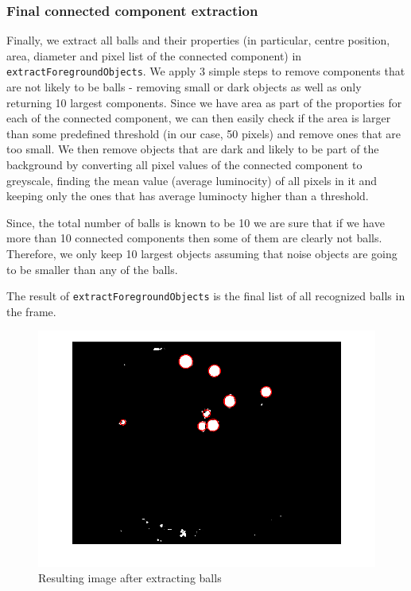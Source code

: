\documentclass[12pt,a4paper]{article}
\begin{document}
\subsubsection{Final connected component extraction}
Finally, we extract all balls and their properties (in particular, centre position, area, diameter and pixel list of the connected component) in \texttt{extractForegroundObjects}. We apply 3 simple steps to remove components that are not likely to be balls - removing small or dark objects as well as only returning 10 largest components. Since we have area as part of the proporties for each of the connected component, we can then easily check if the area is larger than some predefined threshold (in our case, 50 pixels) and remove ones that are too small. We then remove objects that are dark and likely to be part of the background by converting all pixel values of the connected component to greyscale, finding the mean value (average luminocity) of all pixels in it and keeping only the ones that has average luminocty higher than a threshold.

Since, the total number of balls is known to be 10 we are sure that if we have more than 10 connected components then some of them are clearly not balls. Therefore, we only keep 10 largest objects assuming that noise objects are going to be smaller than any of the balls.

The result of \texttt{extractForegroundObjects} is the final list of all recognized balls in the frame.   

\begin{figure}
	\centering
    \includegraphics[width=140mm]{frame_35_imgs/extractForegroundObjects.png}
    \caption{Resulting image after extracting balls}
	\label{my-label02}
\end{figure} 
\end{document}
